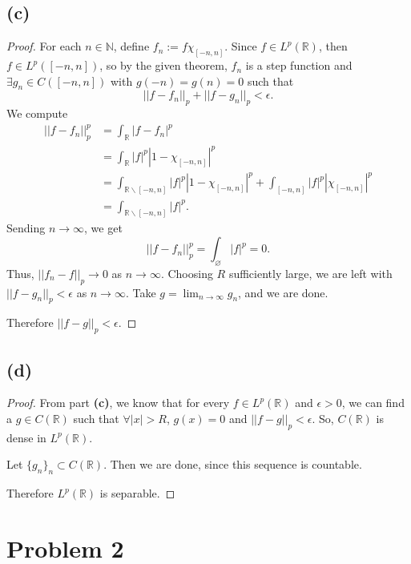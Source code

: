 \documentclass{article}
\newcommand{\R}{\mathbb{R}} %
\newcommand{\N}{\mathbb{N}} %
\begin{document}
\subsection*{(c)}
\begin{proof}
	For each $n \in \N$, define $f_n := f \chi_{[-n, n]}$. Since $f \in L^p(\R)$, then $f\in L^p([-n, n])$, so by the given theorem, $f_n$ is a step function and $\exists g_n \in C([-n, n])$ with $g(-n) = g(n) = 0$ such that
	\begin{equation}
		||f - f_n||_p + ||f - g_n||_p < \epsilon.
	\end{equation}
	We compute
	\begin{align}
		||f - f_n||_p ^p &= \int_{\R} |f - f_n|^p \\
		&= \int_{\R} |f|^p |1 - \chi_{[-n, n]}|^p \\
		&= \int_{\R \backslash [-n, n]} |f|^p |1 - \chi_{[-n, n]}|^p + \int_{[-n, n]} |f|^p |\chi_{[-n, n]}|^p \\
		&= \int_{\R \backslash [-n, n]} |f|^p.
	\end{align}
	Sending $n \to \infty$, we get
	\begin{equation}
		||f - f_n||_p ^p = \int_{\varnothing}|f|^p = 0.
	\end{equation}
	Thus, $||f_n - f||_p \to 0$ as $n \to \infty$. Choosing $R$ sufficiently large, we are left with $||f - g_n||_p < \epsilon$ as $n \to \infty$. Take $g = \lim_{n \to \infty} g_n$, and we are done.
	
	Therefore $||f - g||_p < \epsilon$.
\end{proof}

\subsection*{(d)}
\begin{proof}
	From part \textbf{(c)}, we know that for every $f \in L^p(\R)$ and $\epsilon > 0$, we can find a $g \in C(\R)$ such that $\forall |x| > R$, $g(x)=0$ and $||f - g||_p < \epsilon$. So, $C(\R)$ is dense in $L^p(\R)$.
	
	Let $\{g_n\}_n \subset C(\R)$. Then we are done, since this sequence is countable.
	
	Therefore $L^p(\R)$ is separable.
\end{proof}
\section*{Problem 2}
\end{document}
